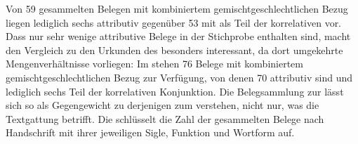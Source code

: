 Von 59 gesammelten Belegen mit kombiniertem gemischtgeschlechtlichen Bezug
liegen lediglich sechs attributiv gegenüber 53 mit 
als Teil der korrelativen  
 vor. Dass nur sehr wenige attributive Belege in
der Stichprobe enthalten sind, macht den Vergleich zu den Urkunden
des \CAO{} besonders interessant, da dort umgekehrte Mengenverhältnisse
vorliegen: Im \CAO{} stehen 76 Belege mit kombiniertem gemischtgeschlechtlichen
Bezug zur Verfügung, von denen 70 attributiv sind und lediglich sechs Teil der
korrelativen Konjunktion. Die Belegsammlung zur \KC{} lässt sich so als
Gegengewicht zu derjenigen zum \CAO{} verstehen, nicht nur, was die Textgattung
betrifft. Die  schlüsselt die Zahl der gesammelten Belege
nach Handschrift mit ihrer jeweiligen Sigle, Funktion und Wortform auf.


